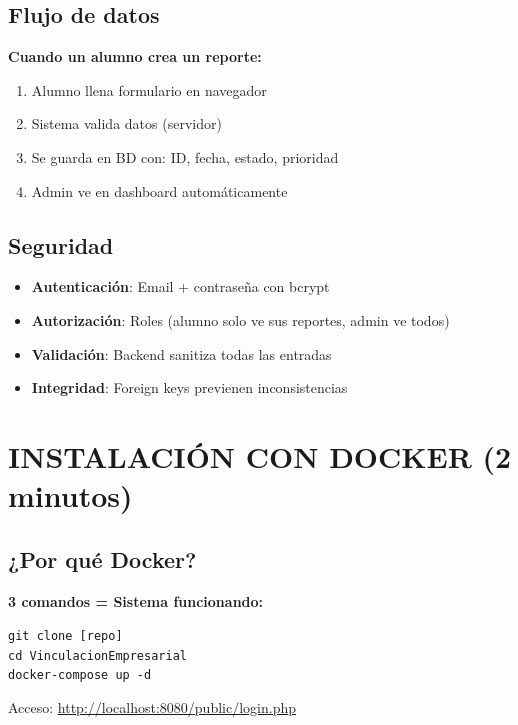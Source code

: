 \documentclass[12pt, a4paper, spanish]{article}
\begin{document}
\subsection{Flujo de datos}

\textbf{Cuando un alumno crea un reporte:}

\begin{enumerate}
    \item Alumno llena formulario en navegador
    \item Sistema valida datos (servidor)
    \item Se guarda en BD con: ID, fecha, estado, prioridad
    \item Admin ve en dashboard automáticamente
\end{enumerate}

\subsection{Seguridad}

\begin{itemize}
    \item \textbf{Autenticación}: Email + contraseña con bcrypt
    \item \textbf{Autorización}: Roles (alumno solo ve sus reportes, admin ve todos)
    \item \textbf{Validación}: Backend sanitiza todas las entradas
    \item \textbf{Integridad}: Foreign keys previenen inconsistencias
\end{itemize}

\newpage

\section{INSTALACIÓN CON DOCKER (2 minutos)}

\subsection{¿Por qué Docker?}

\begin{tcolorbox}[colback=verde!10, colframe=verde!50]
\textbf{3 comandos = Sistema funcionando:}

\texttt{git clone [repo]} \\
\texttt{cd VinculacionEmpresarial} \\
\texttt{docker-compose up -d}

Acceso: \url{http://localhost:8080/public/login.php}
\end{tcolorbox}
\end{document}
